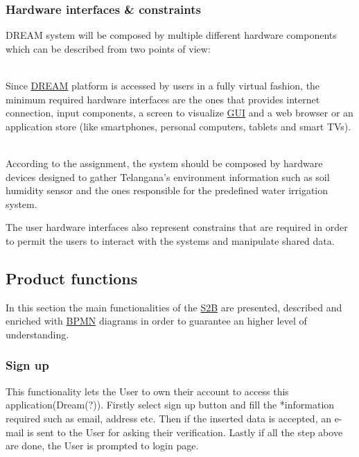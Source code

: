 \subsubsection{Hardware interfaces \& constraints}
DREAM system will be composed by multiple different hardware components which can be described from two points of view:
\begin{description}[font=~\normalfont\scshape]
    \item[\textbf{\textcolor{myblue}{user perspective}}] \hfill \\Since \hyperref[tab:acronymsTable]{DREAM} platform is accessed by users in a fully virtual fashion, the minimum required hardware interfaces are the ones that provides internet connection, input components, a screen to visualize \hyperref[tab:acronymsTable]{GUI} and a web browser or an application store (like smartphones, personal computers, tablets and smart TVs).
    \item[\textbf{\textcolor{myblue}{system perspective}}] \hfill \\According to the assignment, the system should be composed by hardware devices designed to gather Telangana's environment information such as soil humidity sensor and the ones responsible for the predefined water irrigation system.
\end{description}
The user hardware interfaces also represent constrains that are required in order to permit the users to interact with the systems and manipulate shared data.

\subsection{Product functions}
\label{sect:product_functions}
In this section the main functionalities of the \hyperref[tab:acronymsTable]{S2B} are presented, described and enriched with \hyperref[tab:acronymsTable]{BPMN} diagrams in order to guarantee an higher level of understanding.
\subsubsection{Sign up}
This functionality lets the User to own their account to access this application(Dream(?)).
Firstly select sign up button and fill the *information required such as email, address etc.
Then if the inserted data is accepted, an e-mail is sent to the User for asking their
verification.
Lastly if all the step above are done, the User is prompted to login page.

